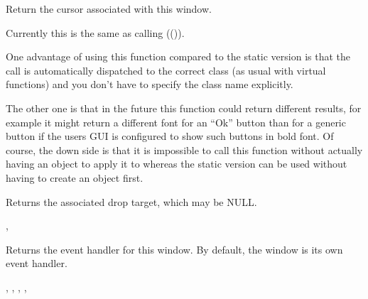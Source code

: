 \label{wxwindowgetcursor}


Return the cursor associated with this window.




\label{wxwindowgetdefaultattributes}


Currently this is the same as calling
(()).

One advantage of using this function compared to the static version is that
the call is automatically dispatched to the correct class (as usual with
virtual functions) and you don't have to specify the class name explicitly.

The other one is that in the future this function could return different
results, for example it might return a different font for an ``Ok'' button
than for a generic button if the users GUI is configured to show such buttons
in bold font. Of course, the down side is that it is impossible to call this
function without actually having an object to apply it to whereas the static
version can be used without having to create an object first.


\label{wxwindowgetdroptarget}


Returns the associated drop target, which may be NULL.


,


\label{wxwindowgeteventhandler}


Returns the event handler for this window. By default, the window is its
own event handler.


,\rtfsp
{},\rtfsp
{},\rtfsp
{},\rtfsp
{}\rtfsp


